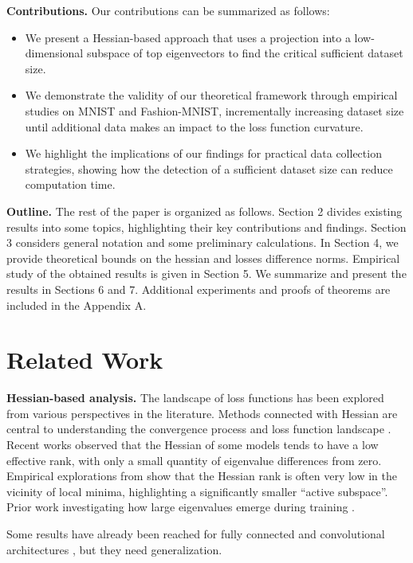 \documentclass{article}
\begin{document}
\textbf{Contributions.} Our contributions can be summarized as follows:
\begin{itemize}
  \item We present a Hessian-based approach that uses a projection into a low-dimensional subspace of top eigenvectors to
        find the critical sufficient dataset size.
  \item We demonstrate the validity of our theoretical framework through empirical studies on MNIST and Fashion-MNIST,
        incrementally increasing dataset size until additional data makes an impact to the loss function curvature.
  \item We highlight the implications of our findings for practical data collection strategies, showing how the detection of
        a sufficient dataset size can reduce computation time.
\end{itemize}

\textbf{Outline.} The rest of the paper is organized as follows. Section 2 divides existing results into some
topics, highlighting their key contributions and findings. Section 3 considers general notation and
some preliminary calculations. In Section 4, we provide theoretical bounds on the hessian and losses
difference norms. Empirical study of the obtained results is given in Section 5. We summarize and
present the results in Sections 6 and 7. Additional experiments and proofs of theorems are included
in the Appendix A.

\section{Related Work}\label{sec:rw}

\textbf{Hessian-based analysis.}
The landscape of loss functions has been explored from various perspectives in the literature. Methods connected with Hessian
are central to understanding the convergence process and loss function landscape \cite{kiselev2024unraveling}. Recent works
observed that the Hessian of some models tends to have a low effective rank, with only a small quantity of eigenvalue
differences from zero. Empirical explorations from \cite{sagun2018empirical} show that the Hessian rank is often very low in
the vicinity of local minima, highlighting a significantly smaller “active subspace”.
Prior work investigating how large eigenvalues emerge during training \cite{ghorbani2019investigation}.

Some results have already been reached for fully connected and convolutional architectures \cite{meshkov2024convnets},
but they need generalization.
\end{document}
